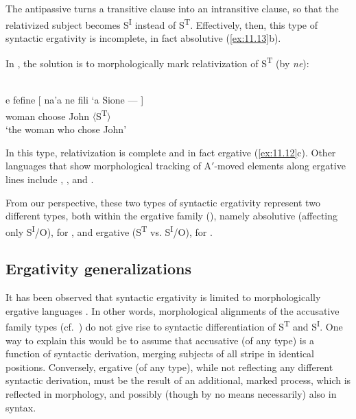 \documentclass[output=paper]{langsci/langscibook}
\begin{document}
The antipassive turns a transitive clause into an intransitive clause, so that
the relativized subject becomes S\textsuperscript{I} instead of
S\textsuperscript{T}. Effectively, then, this type of syntactic ergativity is
incomplete, in fact absolutive (\ref{ex:11.13}b).

In , the solution is to morphologically mark relativization of
S\textsuperscript{T} (by \emph{ne}):\newpage

\ea%
    \label{ex:11.22} {\parencite[81]{Otsuka2006}}\\
    \gll e    fefine  [  na'a  ne  fili      ‘a    Sione  —    ]\\
        \Def{}  woman {}   \Pst{}  \Tsg{}  choose    \Abs{}  John  〈S\textsuperscript{T}〉\\
    \glt ‘the woman who chose John’
    \z

In this type, relativization is complete and in fact ergative
(\ref{ex:11.12}c). Other languages that show morphological tracking of
A$'$-moved elements along ergative lines include , ,
and  \citep[180--181]{Deal2016}.

From our perspective, these two types of syntactic ergativity represent two
different  types, both within the ergative family (), namely
absolutive (affecting only S\textsuperscript{I}/O), for , and
ergative (S\textsuperscript{T} vs. S\textsuperscript{I}/O), for .

\subsection{Ergativity generalizations}\label{sec:11.5.6}

It has been observed that syntactic ergativity is limited to
morphologically ergative languages
\citep[172]{Dixon1994}. In other words, morphological alignments of the
accusative family types (cf.\ ) do not give rise to
syntactic differentiation of S\textsuperscript{T} and S\textsuperscript{I}. One
way to explain this would be to assume that accusative  (of any
type) is a function of syntactic derivation, merging subjects of all stripe in
identical positions. Conversely, ergative  (of any type), while
not reflecting any different syntactic derivation, must be the result of an
additional, marked process, which is reflected in morphology, and possibly
(though by no means necessarily) also in syntax.
\end{document}

